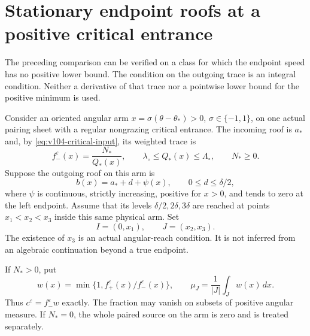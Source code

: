 \section{Stationary endpoint roofs at a positive critical entrance}
\label{sec:v104-stationary}
The preceding comparison can be verified on a class for which the
endpoint speed has no positive lower bound. The condition on the
outgoing trace is an integral condition. Neither a derivative of that
trace nor a pointwise lower bound for the positive minimum is used.

Consider an oriented angular arm $x=\sigma(\theta-\theta_*)>0$,
$\sigma\in\{-1,1\}$, on one actual pairing sheet
with a regular nongrazing critical entrance. The incoming roof is
$a_*$ and, by \eqref{eq:v104-critical-input}, its weighted trace is
\begin{equation}\label{eq:v104-incoming}
 f_-^\varepsilon(x)=\frac{N_*}{Q_*(x)},\qquad
 \lambda_\circ\le Q_*(x)\le\Lambda_\circ,
 \qquad N_*\ge0.
\end{equation}
Suppose the outgoing roof on this arm is
\begin{equation}\label{eq:v104-profile}
 b(x)=a_*+d+\psi(x),\qquad 0\le d\le\delta/2,
\end{equation}
where $\psi$ is continuous, strictly increasing, positive for $x>0$,
and tends to zero at the left endpoint. Assume that its levels
$\delta/2,2\delta,3\delta$ are reached at points
$x_1<x_2<x_3$ inside this same physical arm. Set
\[
 I=(0,x_1),\qquad J=(x_2,x_3).
\]
The existence of $x_3$ is an actual angular-reach condition. It is
not inferred from an algebraic continuation beyond a true endpoint.

If $N_*>0$, put
\begin{equation}\label{eq:v104-fraction}
 w(x)=\min\{1,f_+^\varepsilon(x)/f_-^\varepsilon(x)\},
 \qquad \mu_J=\frac1{|J|}\int_Jw(x)\,dx.
\end{equation}
Thus $c^\varepsilon=f_-^\varepsilon w$ exactly. The fraction may
vanish on subsets of positive angular measure. If $N_*=0$, the
whole paired source on the arm is zero and is treated separately.

